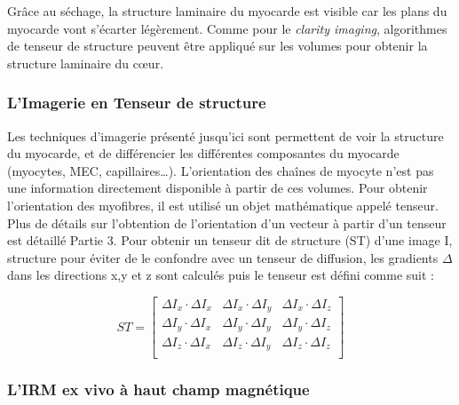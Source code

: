 Grâce au séchage, la structure laminaire du myocarde est visible car les plans du myocarde vont s’écarter légèrement. Comme pour le \textit{clarity imaging}, algorithmes de tenseur de structure peuvent être appliqué sur les volumes pour obtenir la structure laminaire du cœur.

	\subsubsection{L’Imagerie en Tenseur de structure}

Les techniques d’imagerie présenté jusqu’ici sont permettent de voir la structure du myocarde, et de différencier les différentes composantes du myocarde (myocytes, MEC, capillaires…). L’orientation des chaînes de myocyte n’est pas une information directement disponible à partir de ces volumes. Pour obtenir l’orientation des myofibres, il est utilisé un objet mathématique appelé tenseur. Plus de détails sur l’obtention de l’orientation d’un vecteur à partir d’un tenseur est détaillé Partie 3. Pour obtenir un tenseur dit de structure (ST) d’une image I, structure pour éviter de le confondre avec un tenseur de diffusion, les gradients $\Delta$ dans les directions x,y et z sont calculés puis le tenseur est défini comme suit :


\begin{equation}
\nonumber
ST =
\begin{bmatrix}
\Delta I_x \cdot \Delta I_x & \Delta I_x \cdot \Delta I_y & \Delta I_x \cdot \Delta I_z\\
\Delta I_y \cdot \Delta I_x & \Delta I_y \cdot \Delta I_y & \Delta I_y \cdot \Delta I_z\\
\Delta I_z \cdot \Delta I_x & \Delta I_z \cdot \Delta I_y & \Delta I_z \cdot \Delta I_z\\
\end{bmatrix}
\end{equation}

\subsubsection{L’IRM ex vivo à haut champ magnétique}

